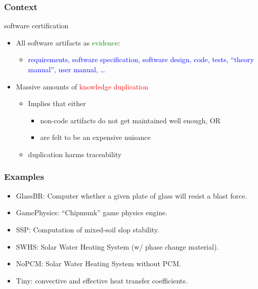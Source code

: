 \documentclass{beamer}
\begin{document}

\begin{frame}
\frametitle{Context}
{\Large software certification}
\vspace*{.2cm}
\begin{itemize}
\item<3->All software artifacts as \textcolor{green}{evidence}:
\begin{itemize}
\item \textcolor{blue}{requirements, software specification, software design, code, 
  tests, ``theory manual'', user manual, \ldots}
\end{itemize}
\vspace*{.5cm}
\item<4->Massive amounts of \textcolor{red}{knowledge duplication}
\begin{itemize}
  \item Implies that either
  \begin{itemize}
    \item non-code artifacts do not get maintained well enough, OR
    \item are felt to be an expensive nuisance
  \end{itemize}
  \item duplication harms traceability
\end{itemize}
\end{itemize}
\vfill
\end{frame}

\begin{frame}
\frametitle{Examples}
\begin{itemize}
\item {\color{blue}GlassBR}: Computer whether a given plate of glass will resist a blast force.
\item GamePhysics: ``Chipmunk'' game physics engine.
\item SSP: Computation of mixed-soil slop stability.
\item SWHS: Solar Water Heating System (w/ phase change material).
\item NoPCM: Solar Water Heating System without PCM.
\item Tiny: convective and effective heat transfer coefficients.
\end{itemize}
\end{frame}
\end{document}
